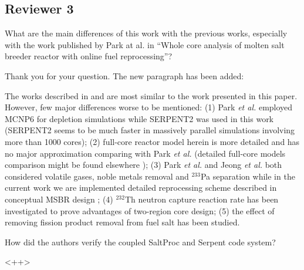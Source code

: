 \documentclass[answers,11pt]{exam}
\begin{document}
\begin{questions}






        \section*{Reviewer 3}


        \question  What are the main differences of this work with the previous 
        works, especially with the work published by Park at al. in ``Whole core 
        analysis of molten salt breeder reactor with online fuel reprocessing''?
        \begin{solution}
                Thank you for your question. The new paragraph has been added:
                
                The works described in \cite{park_whole_2015} and 
                \cite{jeong_equilibrium_2016} are most similar to the work 
                presented in this paper. However, few major differences worse to 
                be mentioned: (1) Park \emph{et al.} employed MCNP6 for depletion 
				simulations while SERPENT2 was used in this work (SERPENT2 seems 
				to be much faster in massively parallel simulations involving more 
				than 1000 cores); (2) full-core reactor model herein is more 
				detailed and has no major approximation comparing with Park \emph{et al.}
				(detailed full-core models comparison might be found elsewhere
				\cite{rykhlevskii_full-core_2017}); (3) Park \emph{et al.} and 
				Jeong \emph{et al.} both considered volatile gases, noble metals 
				removal and $^{233}$Pa separation while in the current work we are 
				implemented detailed reprocessing scheme described in conceptual 
				MSBR design \cite{robertson_conceptual_1971}; (4) $^{232}$Th 
				neutron capture reaction rate has been investigated to prove 
				advantages of two-region core design; (5) the effect of removing 
				fission product removal from fuel salt has been studied. 
        \end{solution}

        \question  How did the authors verify the coupled SaltProc and Serpent 
        code system?  \begin{solution}
                <++>
        \end{solution}


\end{questions}
\end{document}
